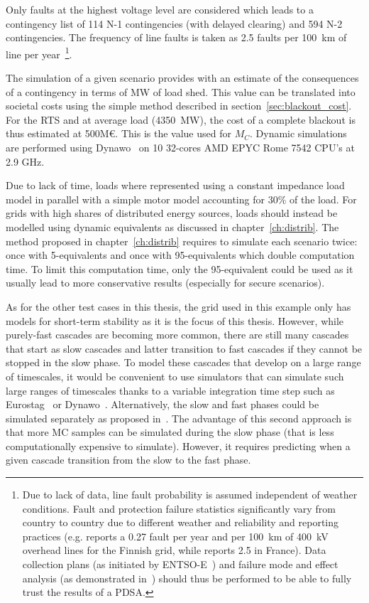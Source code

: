 Only faults at the highest voltage level are considered which leads to a contingency list of 114 N-1 contingencies (with delayed clearing) and 594 N-2 contingencies. The frequency of line faults is taken as 2.5 faults per 100~km of line per year~\cite{FaultStatisticsFrance}\footnote{Due to lack of data, line fault probability is assumed independent of weather conditions. Fault and protection failure statistics significantly vary from country to country due to different weather and reliability and reporting practices (e.g. \cite{GridPSA} reports a 0.27 fault per year and per 100~km of 400~kV overhead lines for the Finnish grid, while \cite{FaultStatisticsFrance} reports 2.5 in France). Data collection plans (as initiated by ENTSO-E~\cite{ENTSOE-PSA}) and failure mode and effect analysis (as demonstrated in~\cite{GridPSA}) should thus be performed to be able to fully trust the results of a PDSA.}.

The simulation of a given scenario provides with an estimate of the consequences of a contingency in terms of MW of load shed. This value can be translated into societal costs using the simple method described in section~\ref{sec:blackout_cost}. For the RTS and at average load (4350~MW), the cost of a complete blackout is thus estimated at 500M€. This is the value used for \(M_C\). Dynamic simulations are performed using Dynawo~\cite{Dynawo} on 10 32-cores AMD EPYC Rome 7542 CPU's at 2.9 GHz.

Due to lack of time, loads where represented using a constant impedance load model in parallel with a simple motor model accounting for 30\% of the load. For grids with high shares of distributed energy sources, loads should instead be modelled using dynamic equivalents as discussed in chapter~\ref{ch:distrib}. The method proposed in chapter~\ref{ch:distrib} requires to simulate each scenario twice: once with 5-equivalents and once with 95-equivalents which double computation time. To limit this computation time, only the 95-equivalent could be used as it usually lead to more conservative results (especially for secure scenarios).

As for the other test cases in this thesis, the grid used in this example only has models for short-term stability as it is the focus of this thesis. However, while purely-fast cascades are becoming more common, there are still many cascades that start as slow cascades and latter transition to fast cascades if they cannot be stopped in the slow phase. To model these cascades that develop on a large range of timescales, it would be convenient to use simulators that can simulate such large ranges of timescales thanks to a variable integration time step such as Eurostag~\cite{STAG} or Dynawo~\cite{Dynawo}. Alternatively, the slow and fast phases could be simulated separately as proposed in~\cite{TwoLevelPSA}. The advantage of this second approach is that more MC samples can be simulated during the slow phase (that is less computationally expensive to simulate). However, it requires predicting when a given cascade transition from the slow to the fast phase.



